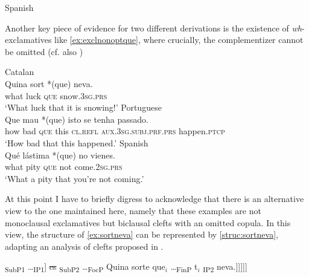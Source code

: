 \ea Spanish
\z	
\z

Another key piece of evidence for two different derivations is the existence of \textit{wh}-exclamatives like \eqref{ex:exclnonoptque}, where crucially, the complementizer cannot be omitted (cf. also \citealt{GonzalezPlanas2010})


\ea \label{ex:exclnonoptque}
\ea\label{ex:sortneva} Catalan\\
\gll  Quina sort *(que) neva. \\
what luck \textsc{que} snow.\textsc{3sg.prs}\\
\glt `What  luck that it is snowing!'
\ex\label{ex:quepassou}
Portuguese\\ 

\gll Que mau *(que) isto se tenha passado.\\
how bad \textsc{que} this \textsc{cl.refl} \textsc{aux.3sg.subj.prf.prs} happen.\textsc{ptcp}\\
\glt `How bad that this  happened.'
\ex\label{ex:lastima1}
		Spanish\\
\gll Qué lástima *(que) no vienes. \\
what pity \textsc{que} not come.\textsc{2sg.prs}\\
\glt `What a pity that you're not coming.'
\z
\z

At this point I have to briefly digress to acknowledge that there is an alternative view to the one maintained here, namely that these examples are not monoclausal exclamatives but biclausal clefts with an omitted copula. In this view, the structure of \eqref{ex:sortneva} can be represented by \eqref{struc:sortneva}, adapting an analysis of clefts proposed in \citet{Belletti2009, Belletti2013}. 
	
\ea\label{struc:sortneva} {\ob}\textsubscript{SubP1} \dots {\ob}\textsubscript{IP1}] \sout{es} {\ob}\textsubscript{SubP2} \dots {\ob}\textsubscript{FocP} Quina sorte {que}$_i$ \dots {\ob}\textsubscript{FinP} t$_i$ {\ob}\textsubscript{IP2}
		neva.]]]]]
		\z

